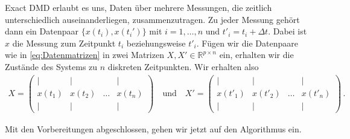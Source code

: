 \documentclass[../Bachelor_LennartKoliwer.tex]{subfiles}
\begin{document}
Exact DMD erlaubt es uns, Daten über mehrere Messungen, die zeitlich unterschiedlich auseinanderliegen, zusammenzutragen. 
Zu jeder Messung gehört dann ein Datenpaar $\{x(t_i),x(t_i')\}$ mit $i=1,\dots,n$ und $t'_i=t_i +\Delta t$.
Dabei ist $x$ die Messung zum Zeitpunkt $t_i$ beziehungsweise $t'_i$.
Fügen wir die Datenpaare wie in \eqref{eq:Datenmatrizen} in zwei Matrizen \(X,X'\in\mathbb{R}^{p\times n}\) ein, erhalten wir die Zustände des Systems zu \(n \) diskreten Zeitpunkten.
Wir erhalten also 
\begin{align}\label{eq:Datenmatrizen}
	X=\begin{pmatrix}
		|      & |      &       & |      \\
		x(t_1) & x(t_2) & \dots & x(t_n) \\
		|      & |      &       & |
	\end{pmatrix}
	\quad \text{und} \quad
	X'=\begin{pmatrix}
		|       & |       &       & |       \\
		x(t'_1) & x(t'_2) & \dots & x(t'_n) \\
		|       & |       &       & |
	\end{pmatrix}\,.
\end{align}




Mit den Vorbereitungen abgeschlossen, gehen wir jetzt auf den Algorithmus ein.
\end{document}
